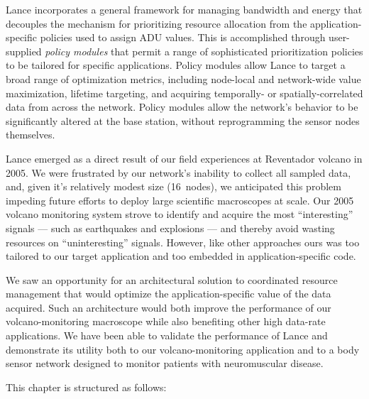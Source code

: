 Lance incorporates a general framework for managing bandwidth and energy that
decouples the mechanism for prioritizing resource allocation from the
application-specific policies used to assign ADU values. This is accomplished
through user-supplied \textit{policy modules} that permit a range of
sophisticated prioritization policies to be tailored for specific
applications. Policy modules allow Lance to target a broad range of
optimization metrics, including node-local and network-wide value
maximization, lifetime targeting, and acquiring temporally- or
spatially-correlated data from across the network. Policy modules allow the
network's behavior to be significantly altered at the base station, without
reprogramming the sensor nodes themselves.

Lance emerged as a direct result of our field experiences at Reventador
volcano in 2005. We were frustrated by our network's inability to collect all
sampled data, and, given it's relatively modest size (16~nodes), we
anticipated this problem impeding future efforts to deploy large scientific
macroscopes at scale. Our 2005 volcano monitoring system strove to identify
and acquire the most ``interesting'' signals --- such as earthquakes and
explosions --- and thereby avoid wasting resources on ``uninteresting''
signals. However, like other approaches ours was too tailored to our target
application and too embedded in application-specific code.

We saw an opportunity for an architectural solution to coordinated resource
management that would optimize the application-specific value of the data
acquired. Such an architecture would both improve the performance of our
volcano-monitoring macroscope while also benefiting other high data-rate
applications. We have been able to validate the performance of Lance and
demonstrate its utility both to our volcano-monitoring application and to a
body sensor network designed to monitor patients with neuromuscular disease.

This chapter is structured as follows:

